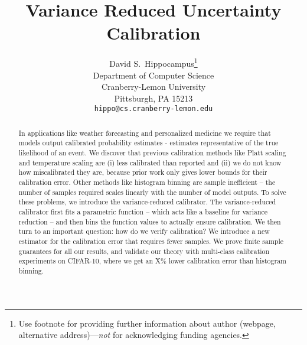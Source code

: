 \documentclass{article}
\title{Variance Reduced Uncertainty Calibration}
\author{%
  David S.~Hippocampus\thanks{Use footnote for providing further information
    about author (webpage, alternative address)---\emph{not} for acknowledging
    funding agencies.} \\
  Department of Computer Science\\
  Cranberry-Lemon University\\
  Pittsburgh, PA 15213 \\
  \texttt{hippo@cs.cranberry-lemon.edu} \\
}
\newcommand{\pl}[1]{\textcolor{red}{[PL: #1]}}
\begin{document}
\maketitle

\begin{abstract}
In applications like weather forecasting and personalized medicine we require that models output calibrated probability estimates - estimates representative of the true likelihood of an event. We discover that previous calibration methods like Platt scaling and temperature scaling are (i) less calibrated than reported and (ii) we do not know how miscalibrated they are, because prior work only gives lower bounds for their calibration error. Other methods like histogram binning are sample inefficient -- the number of samples required scales linearly with the number of model outputs. To solve these problems, we introduce the variance-reduced calibrator. The variance-reduced calibrator first fits a parametric function -- which acts like a baseline for variance reduction -- and then bins the function values to actually ensure calibration. We then turn to an important question: how do we verify calibration? We introduce a new estimator for the calibration error that requires fewer samples. We prove finite sample guarantees for all our results, and validate our theory with multi-class calibration experiments on CIFAR-10, where we get an X\% lower calibration error than histogram binning.

\end{abstract}
\end{document}
